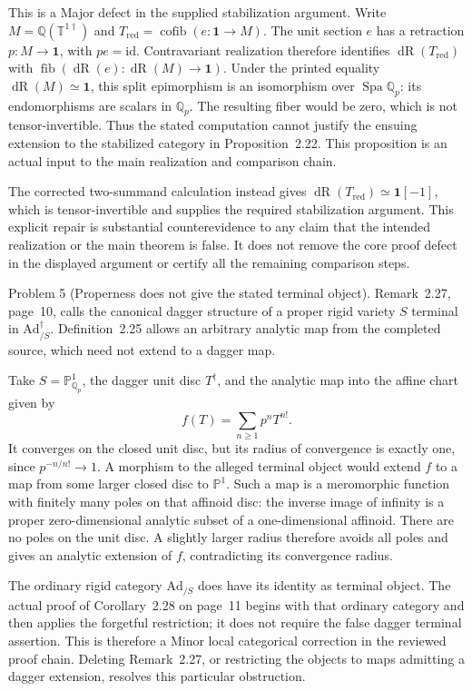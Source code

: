 \documentclass[10pt]{article}
\begin{document}
This is a Major defect in the supplied stabilization argument. Write \(M=\mathbb Q(\mathbb T^{1\dagger})\) and \(T_{\mathrm{red}}=\operatorname{cofib}(e:\mathbf1\to M)\). The unit section \(e\) has a retraction \(p:M\to\mathbf1\), with \(pe=\mathrm{id}\). Contravariant realization therefore identifies \(\operatorname{dR}(T_{\mathrm{red}})\) with \(\operatorname{fib}(\operatorname{dR}(e):\operatorname{dR}(M)\to\mathbf1)\). Under the printed equality \(\operatorname{dR}(M)\simeq\mathbf1\), this split epimorphism is an isomorphism over \(\operatorname{Spa}\mathbb Q_p\): its endomorphisms are scalars in \(\mathbb Q_p\). The resulting fiber would be zero, which is not tensor-invertible. Thus the stated computation cannot justify the ensuing extension to the stabilized category in Proposition 2.22. This proposition is an actual input to the main realization and comparison chain.\par
The corrected two-summand calculation instead gives \(\operatorname{dR}(T_{\mathrm{red}})\simeq\mathbf1[-1]\), which is tensor-invertible and supplies the required stabilization argument. This explicit repair is substantial counterevidence to any claim that the intended realization or the main theorem is false. It does not remove the core proof defect in the displayed argument or certify all the remaining comparison steps.\par
Problem 5 (Properness does not give the stated terminal object).  Remark 2.27, page 10, calls the canonical dagger structure of a proper rigid variety \(S\) terminal in \(\mathrm{Ad}^{\dagger}_{/S}\). Definition 2.25 allows an arbitrary analytic map from the completed source, which need not extend to a dagger map.\par
Take \(S=\mathbb P^1_{\mathbb Q_p}\), the dagger unit disc \(T^\dagger\), and the analytic map into the affine chart given by \[f(T)=\sum_{n\geq1}p^nT^{n!}.\] It converges on the closed unit disc, but its radius of convergence is exactly one, since \(p^{-n/n!}\to1\). A morphism to the alleged terminal object would extend \(f\) to a map from some larger closed disc to \(\mathbb P^1\). Such a map is a meromorphic function with finitely many poles on that affinoid disc: the inverse image of infinity is a proper zero-dimensional analytic subset of a one-dimensional affinoid. There are no poles on the unit disc. A slightly larger radius therefore avoids all poles and gives an analytic extension of \(f\), contradicting its convergence radius.\par
The ordinary rigid category \(\mathrm{Ad}_{/S}\) does have its identity as terminal object. The actual proof of Corollary 2.28 on page 11 begins with that ordinary category and then applies the forgetful restriction; it does not require the false dagger terminal assertion. This is therefore a Minor local categorical correction in the reviewed proof chain. Deleting Remark 2.27, or restricting the objects to maps admitting a dagger extension, resolves this particular obstruction.\par
\end{document}
